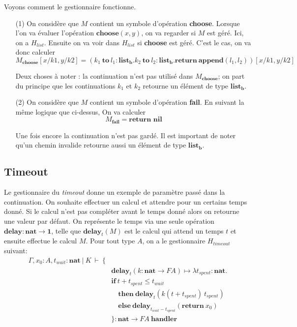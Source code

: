 	Voyons comment le gestionnaire fonctionne. 
	\begin{enumerate}
		\item[(1)] On considère que $M$ contient un symbole d'opération \textbf{choose}. Lorsque l'on va évaluer l'opération $\textbf{choose}(x,y)$, on va regarder si $M$ est géré. Ici, on a $H_{list}$. Ensuite on va voir dans $H_{list}$ si \textbf{choose} est géré. C'est le cas, on va donc calculer 
		\[M_\textbf{choose} [x/k1,y/k2] = (k_1~\textbf{to}~l_1:\textbf{list}_\textbf{b}.k_2~\textbf{to}~l_2:\textbf{list}_\textbf{b}.\textbf{return}~\textbf{append}(l_1,l_2))[x/k1,y/k2]\]
		
		Deux choses à noter : la continuation n'est pas utilisé dans $M_\textbf{choose}$; on part du principe que les continuations $k_1$ et $k_2$ retourne un élément de type $\textbf{list}_\textbf{b}$.
		
		\item[(2)]On considère que $M$ contient un symbole d'opération \textbf{fail}. En suivant la même logique que ci-dessus, On va calculer
		\[M_\textbf{fail} = \textbf{return~nil}\]
		
		Une fois encore la continuation n'est pas gardé. Il est important de noter qu'un chemin invalide retourne aussi un élément de type $\textbf{list}_\textbf{b}$.
	\end{enumerate}
\subsection{Timeout}

	Le gestionnaire du \textit{timeout} donne un exemple de paramètre passé dans la continuation. On souhaite effectuer un calcul et attendre pour un certains temps donné. Si le calcul n'est pas compléter avant le temps donné alors on retourne une valeur par défaut. On représente le temps via une seule opération $\textbf{delay} : \textbf{nat} \rightarrow \textbf{1}$, telle que $\textbf{delay}_t(M)$ est le calcul qui attend un temps $t$ et ensuite effectue le calcul $M$. Pour tout type $A$, on a le gestionnaire $H_{timeout}$ suivant: 
	\begin{align*}
		\Gamma,x_0:A,t_{wait}:\textbf{nat}~|~K~\vdash~\{& \\
		&\textbf{delay}_t(k:\textbf{nat} \rightarrow FA) \mapsto \lambda t_{spent} :\textbf{nat}.\\
		&\textbf{if}~t+t_{spent} \leq t_{wait}\\
		&\quad\textbf{then}~\textbf{delay}_t(k(t+t_{spent})~t_{spent})\\
		&\quad\textbf{else}~\textbf{delay}_{t_{wait} - t_{spent}}(\textbf{return}~x_0) \\
		&\}:\textbf{nat} \rightarrow FA~\textbf{handler}
	\end{align*}
	\newpage
	
